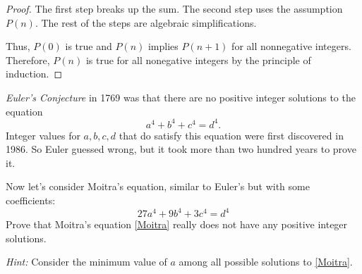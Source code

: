 \documentclass[twoside,12pt]{article}
\begin{document}
\begin{problem}{14}
{\begin{proof}
The first step breaks up the sum. The second step uses the assumption $P(n)$. The rest of the steps are algebraic simplifications.

Thus, $P(0)$ is true and $P(n)$ implies $P(n+1)$ for all nonnegative integers.
Therefore, $P(n)$ is true for all nonegative integers by the principle of
induction.

\end{proof}
}

\eparts

\end{problem}

\begin{problem}{8}\textit{Euler's Conjecture} in 1769 was that there are no positive integer solutions to the 
equation
\begin{equation}
a^4 + b^4 + c^4 = d^4.
\end{equation}
Integer values for $a, b, c, d$ that do satisfy this equation were first discovered in 1986.  
So Euler guessed wrong, but it took more than two hundred years to prove it.

Now let's consider Moitra's equation, similar to Euler's but with some coefficients:
\begin{equation}\label{Moitra}
27a^4 + 9b^4 + 3c^4 = d^4
\end{equation}
Prove that Moitra's equation \eqref{Moitra} really does not have any positive integer solutions.

\textit{Hint:}   Consider the minimum value of $a$ among all possible solutions to \eqref{Moitra}.


\end{problem}
\end{document}
